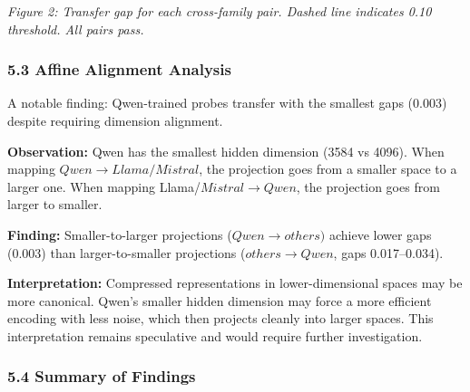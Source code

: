 \textit{Figure 2: Transfer gap for each cross-family pair. Dashed line indicates 0.10 threshold. All pairs pass.}

\subsubsection{5.3 Affine Alignment Analysis}

A notable finding: Qwen-trained probes transfer with the smallest gaps (0.003) despite requiring dimension alignment.

\textbf{Observation:} Qwen has the smallest hidden dimension (3584 vs 4096). When mapping $Qwen\rightarrow Llama/Mistral$, the projection goes from a smaller space to a larger one. When mapping Llama/$Mistral\rightarrow Qwen$, the projection goes from larger to smaller.

\textbf{Finding:} Smaller-to-larger projections ($Qwen\rightarrow others)$ achieve lower gaps (0.003) than larger-to-smaller projections ($others\rightarrow Qwen$, gaps 0.017--0.034).

\textbf{Interpretation:} Compressed representations in lower-dimensional spaces may be more canonical. Qwen's smaller hidden dimension may force a more efficient encoding with less noise, which then projects cleanly into larger spaces. This interpretation remains speculative and would require further investigation.

\subsubsection{5.4 Summary of Findings}

\begin{table}[htbp]
\centering
{}
\end{table}
